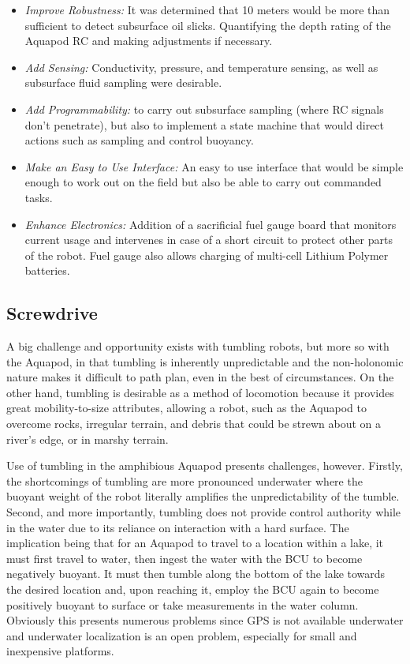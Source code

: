 \begin{itemize}
	\item \emph{Improve Robustness:} It was determined that 10 meters would be more than sufficient to detect subsurface oil slicks. Quantifying the depth rating of the Aquapod RC and making adjustments if necessary. 
	\item \emph{Add Sensing:} Conductivity, pressure, and temperature sensing, as well as subsurface fluid sampling were desirable. 
	\item \emph{Add Programmability:} to carry out subsurface sampling (where RC signals don't penetrate), but also to implement a state machine that would direct actions such as sampling and control buoyancy.
	\item \emph{Make an Easy to Use Interface:} An easy to use interface that would be simple enough to work out on the field but also be able to carry out commanded tasks. 
	\item \emph{Enhance Electronics:} Addition of a sacrificial fuel gauge board that monitors current usage and intervenes in case of a short circuit to protect other parts of the robot. Fuel gauge also allows charging of multi-cell Lithium Polymer batteries. 
\end{itemize}


\subsection{Screwdrive}
A big challenge and opportunity exists with tumbling robots, but more so with the Aquapod, in that tumbling is inherently unpredictable and the non-holonomic nature makes it difficult to path plan, even in the best of circumstances. On the other hand, tumbling is desirable as a method of locomotion because it provides great mobility-to-size attributes, allowing a robot, such as the Aquapod to overcome rocks, irregular terrain, and debris that could be strewn about on a river's edge, or in marshy terrain. 

Use of tumbling in the amphibious Aquapod presents challenges, however. Firstly, the shortcomings of tumbling are more pronounced underwater where the buoyant weight of the robot literally amplifies the unpredictability of the tumble. Second, and more importantly, tumbling does not provide control authority while in the water due to its reliance on interaction with a hard surface. The implication being that for an Aquapod to travel to a location within a lake, it must first travel to water, then ingest the water with the BCU to become negatively buoyant. It must then tumble along the bottom of the lake towards the desired location and, upon reaching it, employ the BCU again to become positively buoyant to surface or take measurements in the water column. Obviously this presents numerous problems since GPS is not available underwater and underwater localization is an open problem, especially for small and inexpensive platforms.

